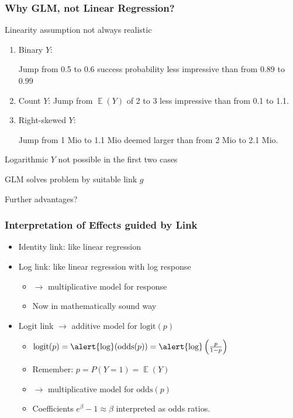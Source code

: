 \documentclass[
    utf8,
    aspectratio=169
]{beamer}  %
\DeclareMathOperator{\E}{\mathbb{E}}  %
\begin{document}
\begin{frame}
\frametitle{Why GLM, not Linear Regression?}
\begin{block}{Linearity assumption not always realistic}
	\begin{enumerate}
		\item Binary $Y$: 
		
		Jump from 0.5 to 0.6 success probability less impressive than from 0.89 to 0.99
		\item Count $Y$: Jump from $\E(Y)$ of 2 to 3 less impressive than from 0.1 to 1.1.
		\item Right-skewed $Y$: 
		
		Jump from 1 Mio to 1.1 Mio deemed larger than from 2 Mio to 2.1 Mio.
	\end{enumerate}
Logarithmic $Y$ not possible in the first two cases
\end{block}

\begin{block}{GLM solves problem by suitable link $g$}
\end{block}

\begin{block}{Further advantages?}
\end{block}
\end{frame}

\begin{frame}
	\frametitle{Interpretation of Effects guided by Link}
	\begin{itemize}
		\item Identity link: like linear regression
		\item Log link: like linear regression with log response
			\begin{itemize}
				\item $\rightarrow$ multiplicative model for response
			    \item Now in mathematically sound way
			\end{itemize}
		\item Logit link $\rightarrow$ additive model for $\text{logit}(p)$
			\begin{itemize}
				\item $\text{logit}(p) = \text{\alert{log}}(\text{odds}(p)) = \text{\alert{log}}\left(\frac{p}{1-p}\right)$
				\item Remember: $p = P(Y=1) = \E(Y)$				
				\item $\rightarrow$ multiplicative model for $\text{odds}(p)$
				\item Coefficients $e^\beta - 1 \approx \beta$ interpreted as odds ratios.
			\end{itemize}
	\end{itemize}
\end{frame}
\end{document}
